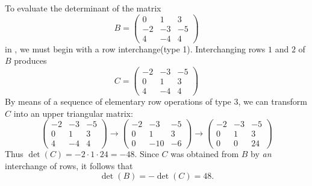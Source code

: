 \begin{example} \label{example 4.2.5}
To evaluate the determinant of the matrix
\[
    B=\left(\begin{array}{rrr}
        0 & 1 & 3 \\
        -2 & -3 & -5 \\
        4 & -4 & 4
    \end{array}\right)
\]
in , we must begin with a row interchange(type 1). 
Interchanging rows \(1\) and \(2\) of \(B\) produces
\[
    C=\left(\begin{array}{rrr}
        -2 & -3 & -5 \\
        0 & 1 & 3 \\
        4 & -4 & 4
    \end{array}\right)
\]
By means of a sequence of elementary row operations of type 3, we can transform \(C\) into an upper triangular matrix:
\[
    \left(\begin{array}{rrr}
        -2 & -3 & -5 \\
        0 & 1 & 3 \\
        4 & -4 & 4
    \end{array}\right)
    \longrightarrow\left(\begin{array}{rrr}
        -2 & -3 & -5 \\
        0 & 1 & 3 \\
        0 & -10 & -6
    \end{array}\right)
    \longrightarrow\left(\begin{array}{rrr}
        -2 & -3 & -5 \\
        0 & 1 & 3 \\
        0 & 0 & 24
    \end{array}\right)
\]
Thus \(\det(C) = -2 \cdot 1 \cdot 24 = -48\).
Since \(C\) was obtained from \(B\) by \emph{an} interchange of rows, it follows that
\[
    \det(B) = -\det(C) = 48.
\]
\end{example}

